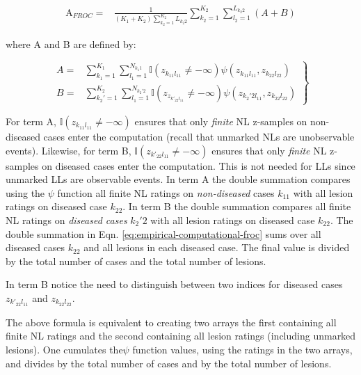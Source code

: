 \documentclass[
]{book}
\begin{document}
\begin{equation}
\begin{aligned}
\text{A}_{FROC} =& \frac{1}{\left ( K_1+K_2 \right )\sum_{k_2=1}^{K_2}L_{k_2 2}}\sum_{k_2=1}^{K_2}\sum_{l_2=1}^{L_{k_2 2}} \left( A+B \right)
\end{aligned}
\label{eq:empirical-computational-froc}
\end{equation}

where A and B are defined by:

\begin{equation}
\left. 
\begin{aligned}
A =& \sum_{k_1=1}^{K_1}\sum_{l_1=1}^{N_{k_1 1}} \mathbb{I} \left ( z_{k_11l_11} \neq  -\infty \right ) \psi\left ( z_{k_11l_11},z_{k_22l_22} \right )\\
B =&\sum_{k_2'=1}^{K_2}\sum_{l_1=1}^{N_{k_2' 2}} \mathbb{I} \left ( z_{z_{k'_22l_11}} \neq  -\infty \right )\psi\left ( z_{k_2'2l_11},z_{k_22l_22} \right )
\end{aligned}
\right \} 
\label{eq:empirical-computational-froc-ab-terms}
\end{equation}

For term A, \(\mathbb{I} \left ( z_{k_11l_11} \neq -\infty \right )\) ensures that only \emph{finite} NL z-samples on non-diseased cases enter the computation (recall that unmarked NLs are unobservable events). Likewise, for term B, \(\mathbb{I} \left ( z_{k'_22l_11} \neq -\infty \right )\) ensures that only \emph{finite} NL z-samples on diseased cases enter the computation. This is not needed for LLs since unmarked LLs are observable events. In term A the double summation compares using the \(\psi\) function all finite NL ratings on \emph{non-diseased} cases \(k_11\) with all lesion ratings on diseased case \(k_22\). In term B the double summation compares all finite NL ratings on \emph{diseased cases} \(k_2'2\) with all lesion ratings on diseased case \(k_22\). The double summation in Eqn. \eqref{eq:empirical-computational-froc} sums over all diseased cases \(k_22\) and all lesions in each diseased case. The final value is divided by the total number of cases and the total number of lesions.

In term B notice the need to distinguish between two indices for diseased cases \(z_{k'_22l_11}\) and \(z_{k_22l_22}\).

The above formula is equivalent to creating two arrays the first containing all finite NL ratings and the second containing all lesion ratings (including unmarked lesions). One cumulates the\(\psi\) function values, using the ratings in the two arrays, and divides by the total number of cases and by the total number of lesions.
\end{document}
